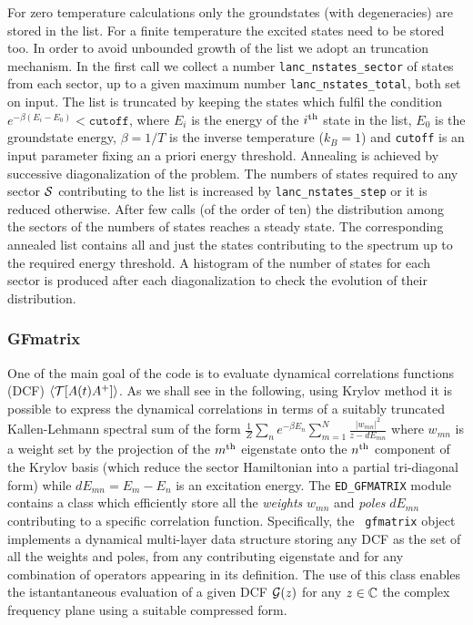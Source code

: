 \documentclass[final,3p,10pt]{elsarticle}
\def\TT{{\cal T}}\def\NN{{\cal N}}\def\BB{{\cal B}} \def\II{{\cal I}}
\def\GG{{\cal G}} \def\SS{{\cal S}}
\def\ibra{\langle}
\def\iket{\rangle}
\begin{document}
For zero temperature calculations only the groundstates (with degeneracies) are stored
in the list.
For a finite temperature the excited states need to be stored too.
In order to avoid unbounded growth of the list we adopt an 
truncation mechanism. In the first call we collect a number 
\texttt{lanc\_nstates\_sector} of states from each sector, up to a
given maximum number \texttt{lanc\_nstates\_total}, both set on input.  
The list is truncated by keeping the states which
fulfil the condition $e^{-\beta(E_i-E_0)} < \mathtt{cutoff}$, where
$E_i$ is the energy of the $i^{\rm th}$ state in the list, $E_0$ is the
groundstate energy,  $\beta=1/T$ is the inverse temperature ($k_B=1$) and \texttt{cutoff}
is an input parameter fixing an a priori energy threshold.
%  
Annealing is achieved by successive diagonalization of the problem.
The numbers of states required to any sector $\SS$ contributing to the list is increased by
\texttt{lanc\_nstates\_step} or it is reduced otherwise. After few calls
(of the order of ten) the distribution among the sectors of the
numbers of states reaches a steady state.
The corresponding annealed list contains all and just the states
contributing to the spectrum up to the required energy threshold.
A histogram of the number of states for each sector is produced after
each diagonalization to check the evolution of their distribution.



\subsubsection{GFmatrix}
One of the main goal of the code is to evaluate dynamical correlations
functions (DCF) $\ibra \TT[ A(t) A^+ ]\iket$. As we shall see in the following, using Krylov method it is
possible to express the dynamical correlations in terms of a suitably
truncated Kallen-Lehmann spectral sum of the form
$\tfrac{1}{Z}\sum_n e^{-\beta E_n} \sum_{m=1}^{N} \tfrac{|w_{mn}|^2}{ z
  - dE_{mn}}$ where $w_{mn}$ is a weight set by the 
projection of the $m^{\rm th}$ eigenstate onto the $n^{\rm th}$
component of the Krylov basis (which reduce the sector Hamiltonian
into a partial tri-diagonal form) while $dE_{mn}=E_m-E_n$ is an excitation energy. 
The {\tt ED\_GFMATRIX} module contains a class which efficiently store all
the {\it weights} $w_{mn}$ and {\it poles} $dE_{mn}$ contributing to
a specific correlation function. Specifically, the {\tt
  gfmatrix} object implements a dynamical multi-layer data structure
storing any DCF as the set of all the weights and poles,
from any contributing eigenstate  and for any
combination of operators appearing in its definition.
The use of this class enables the istantantaneous evaluation of a
given  DCF  $\GG(z)$ for any $z\in\mathbb{C}$ the complex frequency plane
using a suitable compressed form. 
  
\end{document}

